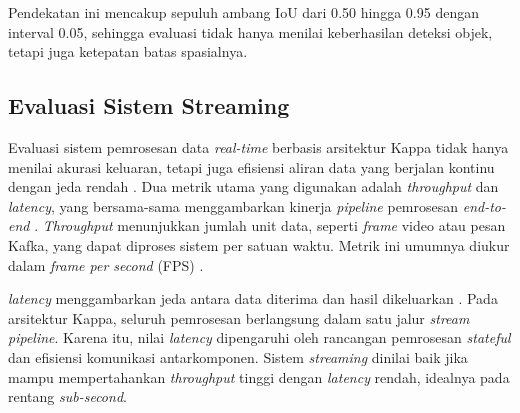 Pendekatan ini mencakup sepuluh ambang IoU dari 0{.}50 hingga 0{.}95 dengan
interval 0{.}05, sehingga evaluasi tidak hanya menilai keberhasilan deteksi
objek, tetapi juga ketepatan batas spasialnya.
\subsection{Evaluasi Sistem Streaming}

Evaluasi sistem pemrosesan data \textit{real-time} berbasis arsitektur Kappa
tidak hanya menilai akurasi keluaran, tetapi juga efisiensi aliran data yang
berjalan kontinu dengan jeda rendah
\cite{kreps2014questioning}. Dua metrik utama yang digunakan adalah
\textit{throughput} dan \textit{latency}, yang bersama-sama menggambarkan
kinerja \textit{pipeline} pemrosesan \textit{end-to-end}
\cite{kleppmann2017designing}. \textit{Throughput} menunjukkan jumlah unit
data, seperti \textit{frame} video atau pesan Kafka, yang dapat diproses
sistem per satuan waktu. Metrik ini umumnya diukur dalam
\textit{frame per second} (FPS) \cite{marz2015big}.

\textit{latency} menggambarkan jeda antara data diterima dan hasil
dikeluarkan \cite{kleppmann2017designing}. Pada arsitektur Kappa, seluruh
pemrosesan berlangsung dalam satu jalur \textit{stream pipeline}. Karena itu,
nilai \textit{latency} dipengaruhi oleh rancangan pemrosesan
\textit{stateful} dan efisiensi komunikasi antarkomponen. Sistem \textit{streaming}
dinilai baik jika mampu mempertahankan \textit{throughput} tinggi dengan
\textit{latency} rendah, idealnya pada rentang \textit{sub-second}.
